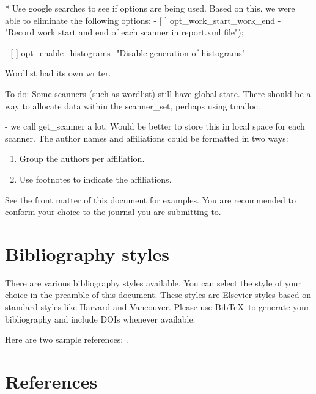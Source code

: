 \documentclass[5p]{elsarticle}
\begin{document}
* Use google searches to see if options are being used. Based on this,
we were able to eliminate the following options:
- [ ] opt\_work\_start\_work\_end - "Record work start and end of each scanner in report.xml file");

- [ ] opt\_enable\_histograms- "Disable generation of histograms"

Wordlist had its own writer.


To do:
Some scanners (such as wordlist) still have global state. There should
be a way to allocate data within the scanner\_set, perhaps using
tmalloc.

- we call get\_scanner a lot. Would be better to store this in local
space for each scanner.
The author names and affiliations could be formatted in two ways:
\begin{enumerate}[(1)]
\item Group the authors per affiliation.
\item Use footnotes to indicate the affiliations.
\end{enumerate}
See the front matter of this document for examples. You are recommended to conform your choice to the journal you are submitting to.

\section{Bibliography styles}

There are various bibliography styles available. You can select the style of your choice in the preamble of this document. These styles are Elsevier styles based on standard styles like Harvard and Vancouver. Please use Bib\TeX\ to generate your bibliography and include DOIs whenever available.

Here are two sample references: \cite{Feynman1963118,Dirac1953888}.

\section*{References}


\end{document}
